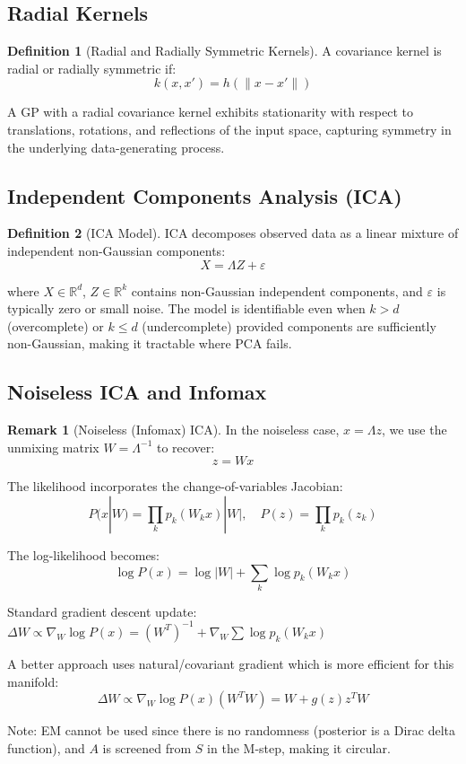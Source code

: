 \documentclass[12pt,a4paper]{article}
\theoremstyle{definition}
\newtheorem{definition}{Definition}[section]
\newtheorem{remark}{Remark}[section]
\begin{document}
\subsection{Radial Kernels}

\begin{definition}[Radial and Radially Symmetric Kernels]
A covariance kernel is radial or radially symmetric if:
\[
k(x, x') = h(\|x - x'\|)
\]

A GP with a radial covariance kernel exhibits stationarity with respect to translations, rotations, and reflections of the input space, capturing symmetry in the underlying data-generating process.
\end{definition}

\subsection{Independent Components Analysis (ICA)}

\begin{definition}[ICA Model]
ICA decomposes observed data as a linear mixture of independent non-Gaussian components:
\[
X = \Lambda Z + \varepsilon
\]

where $X \in \mathbb{R}^d$, $Z \in \mathbb{R}^k$ contains non-Gaussian independent components, and $\varepsilon$ is typically zero or small noise. The model is identifiable even when $k > d$ (overcomplete) or $k \leq d$ (undercomplete) provided components are sufficiently non-Gaussian, making it tractable where PCA fails.
\end{definition}

\subsection{Noiseless ICA and Infomax}

\begin{remark}[Noiseless (Infomax) ICA]
In the noiseless case, $x = \Lambda z$, we use the unmixing matrix $W = \Lambda^{-1}$ to recover:
\[
z = W x
\]

The likelihood incorporates the change-of-variables Jacobian:
\[
P(x | W) = \prod_k p_k(W_k x) |W|, \quad P(z) = \prod_k p_k(z_k)
\]

The log-likelihood becomes:
\[
\log P(x) = \log |W| + \sum_k \log p_k(W_k x)
\]

Standard gradient descent update: $\Delta W \propto \nabla_W \log P(x) = (W^T)^{-1} + \nabla_W \sum \log p_k(W_k x)$

A better approach uses natural/covariant gradient which is more efficient for this manifold:
\[
\Delta W \propto \nabla_W \log P(x)(W^T W) = W + g(z) z^T W
\]

Note: EM cannot be used since there is no randomness (posterior is a Dirac delta function), and $A$ is screened from $S$ in the M-step, making it circular.
\end{remark}
\end{document}
